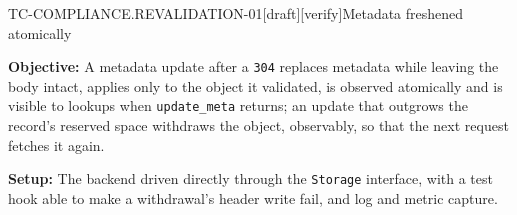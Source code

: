 \begin{requirement}{TC-COMPLIANCE.REVALIDATION-01}[draft][verify]{Metadata freshened atomically}


  \textbf{Objective:} A metadata update after a \texttt{304} replaces metadata
  while leaving the body intact, applies only to the object it validated, is
  observed atomically and is visible to lookups when \texttt{update\_meta}
  returns; an update that outgrows the record's reserved space withdraws the
  object, observably, so that the next request fetches it again.

  \textbf{Setup:} The backend driven directly through the \texttt{Storage}
  interface, with a test hook able to make a withdrawal's header write fail,
  and log and metric capture.


\end{requirement}
